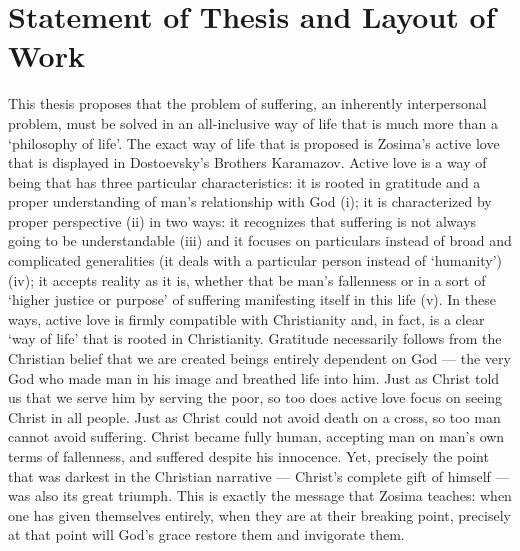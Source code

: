 \section{Statement of Thesis and Layout of Work}

This thesis proposes that the problem of suffering, an inherently interpersonal problem, must be solved in an all-inclusive way of life that is much more than a `philosophy of life'. The exact way of life that is proposed is Zosima's active love that is displayed in Dostoevsky's Brothers Karamazov. Active love is a way of being that has three particular characteristics: it is rooted in gratitude and a proper understanding of man's relationship with God (i); it is characterized by proper perspective (ii) in two ways: it recognizes that suffering is not always going to be understandable (iii) and it focuses on particulars instead of broad and complicated generalities (it deals with a particular person instead of `humanity') (iv); it accepts reality as it is, whether that be man's fallenness or in a sort of `higher justice or purpose' of suffering manifesting itself in this life (v). In these ways, active love is firmly compatible with Christianity and, in fact, is a clear `way of life' that is rooted in Christianity. Gratitude necessarily follows from the Christian belief that we are created beings entirely dependent on God --- the very God who made man in his image and breathed life into him. Just as Christ told us that we serve him by serving the poor, so too does active love focus on seeing Christ in all people. Just as Christ could not avoid death on a cross, so too man cannot avoid suffering. Christ became fully human, accepting man on man's own terms of fallenness, and suffered despite his innocence. Yet, precisely the point that was darkest in the Christian narrative --- Christ's complete gift of himself --- was also its great triumph. This is exactly the message that Zosima teaches: when one has given themselves entirely, when they are at their breaking point, precisely at that point will God's grace restore them and invigorate them.

